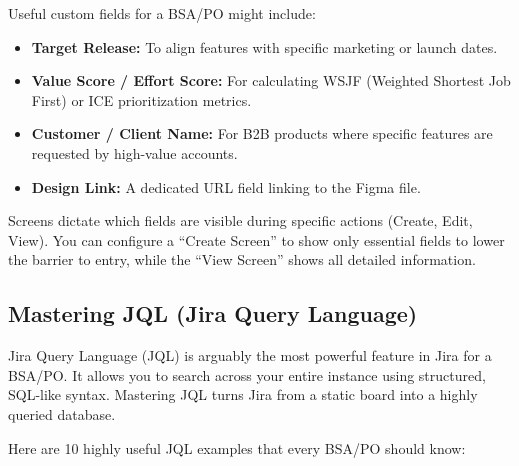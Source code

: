 \documentclass[
  11pt,
  openany,
  oneside]{book}
\providecommand{\tightlist}{%
  \setlength{\itemsep}{0pt}\setlength{\parskip}{0pt}}
\begin{document}
Useful custom fields for a BSA/PO might include:

\begin{itemize}
\tightlist
\item
  \textbf{Target Release:} To align features with specific marketing or
  launch dates.
\item
  \textbf{Value Score / Effort Score:} For calculating WSJF (Weighted
  Shortest Job First) or ICE prioritization metrics.
\item
  \textbf{Customer / Client Name:} For B2B products where specific
  features are requested by high-value accounts.
\item
  \textbf{Design Link:} A dedicated URL field linking to the Figma file.
\end{itemize}

Screens dictate which fields are visible during specific actions
(Create, Edit, View). You can configure a ``Create Screen'' to show only
essential fields to lower the barrier to entry, while the ``View
Screen'' shows all detailed information.

\subsection{Mastering JQL (Jira Query
Language)}\label{mastering-jql-jira-query-language}

Jira Query Language (JQL) is arguably the most powerful feature in Jira
for a BSA/PO. It allows you to search across your entire instance using
structured, SQL-like syntax. Mastering JQL turns Jira from a static
board into a highly queried database.

Here are 10 highly useful JQL examples that every BSA/PO should know:
\end{document}
